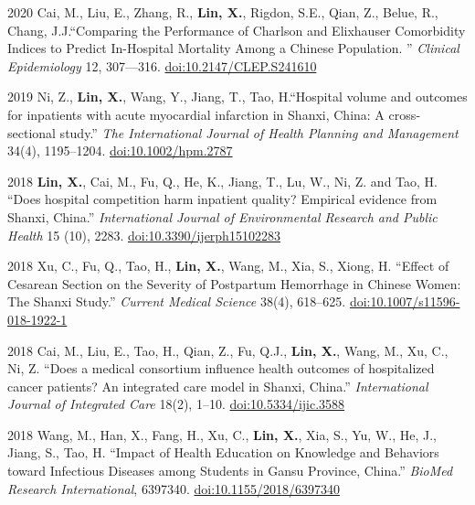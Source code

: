 \documentclass[12pt,letterpaper]{report}
\begin{document}
    \begin{tablist}
    	
    	\item[2020] \tab Cai, M., Liu, E., Zhang, R., \textbf{Lin, X.},  Rigdon, S.E., Qian, Z., Belue, R., Chang, J.J.\enquote{Comparing the Performance of Charlson and Elixhauser Comorbidity Indices to Predict In-Hospital Mortality Among a Chinese Population. } \textit{Clinical Epidemiology} 12, 307—316. \href{https://doi.org/10.2147/CLEP.S241610}{doi:10.2147/CLEP.S241610}
    	
    	\item[2019] \tab Ni, Z.,  \textbf{Lin, X.}, Wang, Y., Jiang, T., Tao, H.\enquote{Hospital volume and outcomes for inpatients with acute myocardial infarction in Shanxi, China: A cross‐sectional study.} \textit{The International Journal of Health Planning and Management} 34(4), 1195–1204. \href{https://doi.org/10.1002/hpm.2787}{doi:10.1002/hpm.2787}
    	
    	\item[2018] \tab \textbf{Lin, X.}, Cai, M., Fu, Q., He, K., Jiang, T., Lu, W., Ni, Z. and Tao, H. \enquote{Does hospital competition harm inpatient quality? Empirical evidence from Shanxi, China.} \textit{International Journal of Environmental Research and Public Health} 15 (10), 2283. \href{https://doi.org/10.3390/ijerph15102283}{doi:10.3390/ijerph15102283}
    	
    	\item[2018] \tab Xu, C., Fu, Q., Tao, H., \textbf{Lin, X.}, Wang, M., Xia, S., Xiong, H. \enquote{Effect of Cesarean Section on the Severity of Postpartum Hemorrhage in Chinese Women: The Shanxi Study.} \textit{Current Medical Science} 38(4), 618–625. \href{https://doi.org/10.1007/s11596-018-1922-1}{doi:10.1007/s11596-018-1922-1}
    	
    	 \item[2018] \tab Cai, M., Liu, E., Tao, H., Qian, Z., Fu, Q.J., \textbf{Lin, X.}, Wang, M., Xu, C., Ni, Z. \enquote{Does a medical consortium influence health outcomes of hospitalized cancer patients? An integrated care model in Shanxi, China.} \textit{International Journal of Integrated Care}  18(2), 1–10. \href{https://doi.org/10.5334/ijic.3588}{doi:10.5334/ijic.3588}
    	 
		\item[2018] \tab Wang, M., Han, X., Fang, H., Xu, C., \textbf{Lin, X.}, Xia, S., Yu, W., He, J., Jiang, S., Tao, H. \enquote{Impact of Health Education on Knowledge and Behaviors toward Infectious Diseases among Students in Gansu Province, China.} \textit{BioMed Research International}, 6397340. \href{https://doi.org/10.1155/2018/6397340}{doi:10.1155/2018/6397340}
		

\end{tablist}
\end{document}
